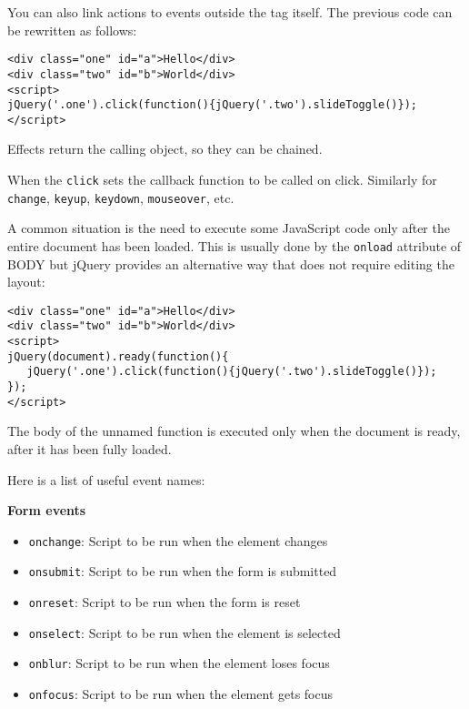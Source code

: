 \documentclass[justified,sixbynine,notoc]{tufte-book}
\def\ft{\small\tt}
\begin{document}
\begin{fullwidth}
You can also link actions to events outside the tag itself. The previous code can be rewritten as follows:
\begin{lstlisting}[keywords={}]
<div class="one" id="a">Hello</div>
<div class="two" id="b">World</div>
<script>
jQuery('.one').click(function(){jQuery('.two').slideToggle()});
</script>
\end{lstlisting}

Effects return the calling object, so they can be chained.

When the {\ft click} sets the callback function to be called on click. Similarly for {\ft change}, {\ft keyup}, {\ft keydown}, {\ft mouseover}, etc.

A common situation is the need to execute some JavaScript code only after the entire document has been loaded. This is usually done by the {\ft onload} attribute of BODY but jQuery provides an alternative way that does not require editing the layout:
\begin{lstlisting}[keywords={}]
<div class="one" id="a">Hello</div>
<div class="two" id="b">World</div>
<script>
jQuery(document).ready(function(){
   jQuery('.one').click(function(){jQuery('.two').slideToggle()});
});
</script>
\end{lstlisting}

The body of the unnamed function is executed only when the document is ready, after it has been fully loaded.

Here is a list of useful event names:

{\bf Form events}

\begin{itemize}
\item {\ft onchange}:   Script to be run when the element changes

\item {\ft onsubmit}:   Script to be run when the form is submitted

\item {\ft onreset}:    Script to be run when the form is reset

\item {\ft onselect}:   Script to be run when the element is selected

\item {\ft onblur}:     Script to be run when the element loses focus

\item {\ft onfocus}:    Script to be run when the element gets focus
\end{itemize}


\end{fullwidth}
\end{document}

